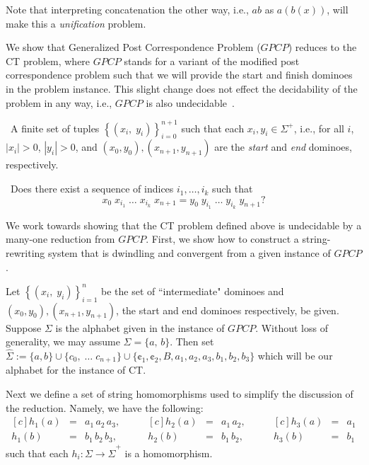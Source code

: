 \documentclass{lmcs} %
\theoremstyle{plain}\newtheorem{satz}[thm]{Satz} %
\begin{document}
Note that interpreting concatenation the other way, i.e., $ab$ as
$a(b(x))$, will make this a \emph{unification} problem.

We show that Generalized Post Correspondence Problem ($GPCP$) reduces
to the CT problem, where $GPCP$ stands for a variant of the modified
post correspondence problem such that we will provide the start and
finish dominoes in the problem instance. This slight change does not
effect the decidability of the problem in any way, i.e., $GPCP$ is
also undecidable~\cite{EKR82,GPCP}. \medskip

\begin{description}[align=left]
  \item[Given]~A finite set of tuples $\left\{(x_i,\; y_i)\right
\}^{n+1}_{i=0}$ such that each $x_i, y_i \in \Sigma^+$, i.e., for all
$i$, $|x_i|>0$, $|y_i|>0$, and $(x_0, y_0), (x_{n+1}, y_{n+1})$ are
the \emph{start} and \emph{end} dominoes, respectively.
  \item[Question]~Does there exist a sequence of indices $i_1, \ldots
,i_k$ such that \[ x_{0}\;x_{i_1}\; \ldots \;x_{i_k}\;x_{n+1} =
y_{0}\;y_{i_1}\; \ldots \; y_{i_k}\;y_{n+1} ? \]
\end{description} \medskip

We work towards showing that the CT problem defined above is
undecidable by a many-one reduction from $GPCP$. First, we show how to
construct a string-rewriting system that is dwindling and convergent
from a given instance of $GPCP$.

Let $\left\{(x_i,\; y_i)\right \}^{n}_{i=1}$ be the set of
``intermediate" dominoes and $(x_0, y_0), (x_{n+1}, y_{n+1})$, the
start and end dominoes respectively, be given. Suppose $\Sigma$ is the
alphabet given in the instance of $GPCP$. Without loss of generality,
we may assume $\Sigma = \{a,\, b\}$. Then set $\hat{\Sigma} := \{a,b\}
\cup \{c_0,\;\ldots\;c_{n+1}\} \cup \{\cent_1, \cent_2, B, a_1, a_2,
a_3, b_1, b_2, b_3\} $ which will be our alphabet for the instance of
CT.

Next we define a set of string homomorphisms used to simplify the
discussion of the reduction. Namely, we have the following:
\begin{equation*}
\begin{aligned}[c] h_1(a) & = & a_1 \, a_2 \, a_3,\\ h_1(b) & = &
b_1\, b_2 \, b_3,
\end{aligned} \qquad
\begin{aligned}[c] h_2(a) & = & a_1 \, a_2, \\ h_2(b) & = & b_1 \,
b_2,
\end{aligned} \qquad
\begin{aligned}[c] h_3(a) & = & a_1 \\ h_3(b) & = & b_1
\end{aligned}
\end{equation*} such that each $h_i : \Sigma \rightarrow
\hat{\Sigma}^+$ is a homomorphism.
\end{document}
